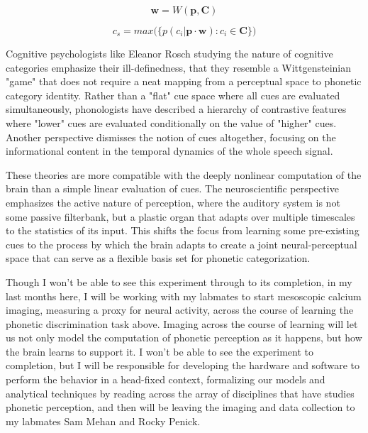 \begin{equation}
\label{eqn:w}
\mathbf{w} = W(\mathbf{p}, \mathbf{C})
\end{equation}

\begin{equation}
\label{eqn:infer_2}
c_s = max\big( \big\{ p(c_i | \mathbf{p} \cdot \mathbf{w}) : c_i \in \mathbf{C} \big\}\big)
\end{equation}

Cognitive psychologists like Eleanor Rosch studying the nature of cognitive categories emphasize their ill-definedness, that they resemble a Wittgensteinian "game" that does not require a neat mapping from a perceptual space to phonetic category identity\cite{roschWittgensteinCategorizationResearch1987, roschFamilyResemblancesStudies1975}. Rather than a "flat" cue space where all cues are evaluated simultaneously, phonologists have described a hierarchy of contrastive features where "lower" cues are evaluated conditionally on the value of "higher" cues\cite{Dresher2008}. Another perspective dismisses the notion of cues altogether, focusing on the informational content in the temporal dynamics of the whole speech signal\cite{kluenderLongstandingProblemsSpeech2019}.

These theories are more compatible with the deeply nonlinear computation of the brain than a simple linear evaluation of cues. The neuroscientific perspective emphasizes the active nature of perception, where the auditory system is not some passive filterbank, but a plastic organ that adapts over multiple timescales to the statistics of its input\cite{angeloniContextualModulationSound2018, holtTemporallyNonadjacentNonlinguistic2005}. This shifts the focus from learning some pre-existing cues to the process by which the brain adapts to create a joint neural-perceptual space that can serve as a flexible basis set for phonetic categorization. 

\begin{todo}
Though I won't be able to see this experiment through to its completion, in my last months here, I will be working with my labmates to start mesoscopic calcium imaging, measuring a proxy for neural activity, across the course of learning the phonetic discrimination task above. Imaging across the course of learning will let us not only model the computation of phonetic perception as it happens, but how the brain learns to support it. I won't be able to see the experiment to completion, but I will be responsible for developing the hardware and software to perform the behavior in a head-fixed context, formalizing our models and analytical techniques by reading across the array of disciplines that have studies phonetic perception, and then will be leaving the imaging and data collection to my labmates Sam Mehan and Rocky Penick.
\end{todo}
